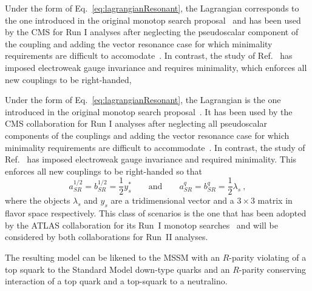   Under the form of Eq.~\eqref{eq:lagrangianResonant}, the Lagrangian corresponds to the one
  introduced in the original monotop search proposal~\cite{AndreaFuksMaltoni} and has been
  used by the CMS for Run I analyses after neglecting the pseudoscalar component
  of the coupling and adding the vector resonance case for which minimality
  requirements are difficult to accomodate~\cite{CMSmonotop}. In contrast, the
  study of  Ref.~\cite{Boucheneb:2014wza} has imposed electroweak gauge invariance and
  requires minimality, which enforces all new couplings to be right-handed,




Under the form of Eq.~\eqref{eq:lagrangianResonant}, the Lagrangian is the one
introduced in the original monotop search proposal~\cite{AndreaFuksMaltoni}. It has been
used by the CMS collaboration for Run I analyses after neglecting all pseudoscalar components
of the couplings and adding the vector resonance case for which minimality
requirements are difficult to accommodate~\cite{CMSmonotop}. In contrast, the
study of Ref.~\cite{Boucheneb:2014wza} has imposed electroweak gauge invariance and
required minimality. This enforces all new couplings to be right-handed so that
\begin{equation}
a^{1/2}_{SR} = b^{1/2}_{SR} = \frac12 y_s^*
\qquad\text{and}\qquad
a^q_{SR} = b^q_{SR} = \frac12 \lambda_s \ ,
\end{equation}
where the objects $\lambda_s$ and $y_s$ are
a tridimensional vector and a $3\times 3$ matrix
in flavor space respectively. 
This class of scenarios is the one that has been adopted by the ATLAS collaboration for its
Run~I monotop searches~\cite{ATLASmonotop} and will be considered by both
collaborations for Run~II analyses.


The resulting model can be likened to the MSSM with an $R$-parity violating of
a top squark to the Standard Model down-type quarks and an $R$-parity
conserving interaction of a top quark and a top-squark to a neutralino.
  

\label{sec:NonResonantProd}

